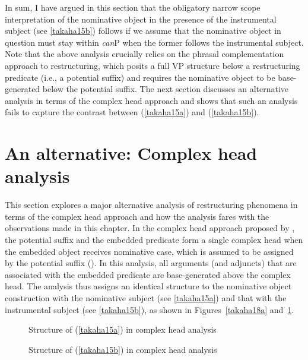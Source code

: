 \documentclass[output=paper]{langscibook}
\begin{document}
In sum, I have argued in this section that the obligatory narrow scope interpretation of the nominative object in the presence of the instrumental subject (see \ref{takaha15b}) follows if we assume that the nominative object in question must stay within \emph{can}P when the former follows the instrumental subject. Note that the above analysis crucially relies on the phrasal complementation approach to restructuring, which posits a full VP structure below a restructuring predicate (i.e., a potential suffix) and requires the nominative object to be base-generated below the potential suffix. The next section discusses an alternative analysis in terms of the complex head approach and shows that such an analysis fails to capture the contrast between (\ref{takaha15a}) and (\ref{takaha15b}).

\section{An alternative: Complex head analysis} \label{takahas4}
This section explores a major alternative analysis of restructuring phenomena in terms of the complex head approach and how the analysis fares with the observations made in this chapter.
In the complex head approach proposed by \citet{SaitoHoshi1998}, the potential suffix and the embedded predicate form a single complex head when the embedded object receives nominative case, which is assumed to be assigned by the potential suffix (\citealt{kuno1973}). In this analysis, all arguments (and adjuncts) that are associated with the embedded predicate are base-generated above the complex head. The analysis thus assigns an identical structure to the nominative object construction with the nominative subject (see \ref{takaha15a}) and that with the instrumental subject (see \ref{takaha15b}), as shown in Figures~\ref{takaha18a} and~\ref{takaha18b}.

\begin{figure}
\begin{floatrow}
\captionsetup{margin=.05\linewidth}
		{\caption{\label{takaha18a}Structure of (\ref{takaha15a}) in complex head analysis}}
		{\caption{\label{takaha18b}Structure of (\ref{takaha15b}) in complex head analysis}}
\end{floatrow}
\end{figure}
\end{document}

